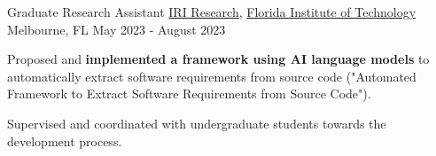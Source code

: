 \begin{cventries}
\cventry
{Graduate Research Assistant}
{\href{https://www.fit.edu/faculty-profiles/s/slhoub-khaled-/}{IRI Research},  \href{www.fit.edu}{Florida Institute of Technology}}
{Melbourne, FL}
{May 2023 - August 2023}
{
\begin{cvitems}
\item Proposed and \textbf{implemented a framework using AI language models} to automatically extract software requirements from source code ("Automated Framework to Extract Software Requirements from Source Code").
\item Supervised and coordinated with undergraduate students towards the development process.
\end{cvitems}
}



\end{cventries}
